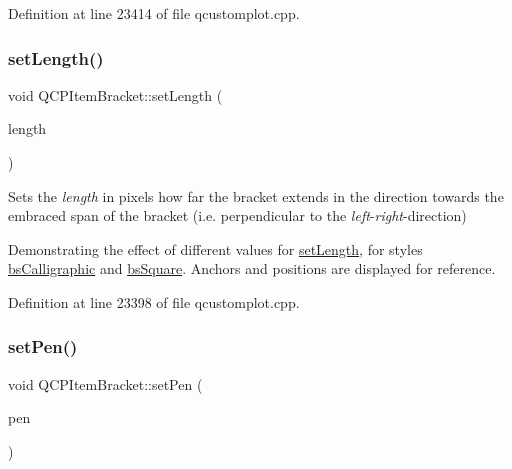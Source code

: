 Definition at line 23414 of file qcustomplot.\+cpp.

\mbox{\label{class_q_c_p_item_bracket_ac7cfc3da7da9b5c5ac5dfbe4f0351b2a}} 
\subsubsection{\texorpdfstring{set\+Length()}{setLength()}}
{\footnotesize\ttfamily void Q\+C\+P\+Item\+Bracket\+::set\+Length (\begin{DoxyParamCaption}\item[{double}]{length }\end{DoxyParamCaption})}

Sets the {\itshape length} in pixels how far the bracket extends in the direction towards the embraced span of the bracket (i.\+e. perpendicular to the {\itshape left}-\/{\itshape right}-\/direction)

 \begin{center}Demonstrating the effect of different values for \hyperlink{class_q_c_p_item_bracket_ac7cfc3da7da9b5c5ac5dfbe4f0351b2a}{set\+Length}, for styles \hyperlink{class_q_c_p_item_bracket_a7ac3afd0b24a607054e7212047d59dbda8f29f5ef754e2dc9a9efdedb2face0f3}{bs\+Calligraphic} and \hyperlink{class_q_c_p_item_bracket_a7ac3afd0b24a607054e7212047d59dbda7f9df4a7359bfe3dac1dbe4ccf5d220c}{bs\+Square}. Anchors and positions are displayed for reference.\end{center}  

Definition at line 23398 of file qcustomplot.\+cpp.

\mbox{\label{class_q_c_p_item_bracket_ab13001d9cc5d8f9e56ea15bdda682acb}} 
\subsubsection{\texorpdfstring{set\+Pen()}{setPen()}}
{\footnotesize\ttfamily void Q\+C\+P\+Item\+Bracket\+::set\+Pen (\begin{DoxyParamCaption}\item[{const Q\+Pen \&}]{pen }\end{DoxyParamCaption})}

